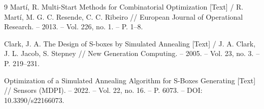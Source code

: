 \begin{thebibliography}{9}
Martí, R. Multi-Start Methods for Combinatorial Optimization [Text] / R. Martí, M. G. C. Resende, C. C. Ribeiro // European Journal of Operational Research. – 2013. – Vol. 226, no. 1. – P. 1–8.

Clark, J. A. The Design of S-boxes by Simulated Annealing [Text] / J. A. Clark, J. L. Jacob, S. Stepney // New Generation Computing. – 2005. – Vol. 23, no. 3. – P. 219–231.

Optimization of a Simulated Annealing Algorithm for S-Boxes Generating [Text] // Sensors (MDPI). – 2022. – Vol. 22, no. 16. – P. 6073. – DOI: 10.3390/s22166073.

\end{thebibliography}




